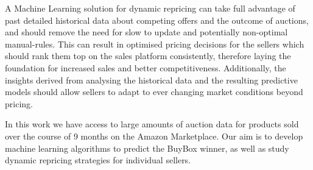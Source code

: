 {A Machine Learning solution for dynamic repricing can take full advantage of past 
detailed historical data about competing offers and the outcome of auctions, and should remove the need 
for slow to update and potentially non-optimal manual-rules.
This can result in optimised pricing decisions for the sellers which should rank them top 
on the sales platform consistently, therefore laying the foundation for increased sales and better competitiveness.
Additionally, the insights derived from analysing the historical data and the resulting predictive models should allow sellers 
to adapt to ever changing market conditions beyond pricing. 

In this work we have access to large amounts of auction data 
for products sold over the course of 9 months on the Amazon Marketplace. 
Our aim is to develop machine learning algorithms to predict the BuyBox winner, as well as study  
dynamic repricing strategies for individual sellers.

}

